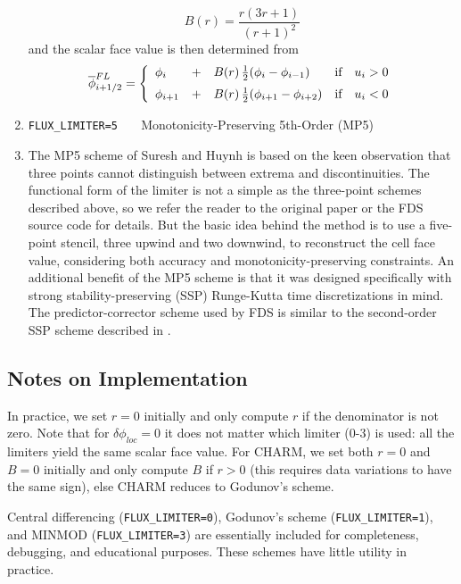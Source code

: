 \begin{enumerate}
\begin{equation}
B(r) = \frac{r(3r+1)}{(r+1)^2}
\end{equation}
and the scalar face value is then determined from
\begin{equation}
\label{eqn_charm_limiter}
\overline{\phi}^{FL}_{i+1/2} = \left\{ \begin{array}{lcll} \phi_i &+& B(r) \,\frac{1}{2}(\phi_i-\phi_{i-1}) & \mbox{if} \quad u_i>0 \vspace{0.2 cm}\\
\phi_{i+1} &+& B(r) \,\frac{1}{2}(\phi_{i+1}-\phi_{i+2}) & \mbox{if} \quad u_i<0 \end{array} \right.
\end{equation}
\item[]{\tt FLUX\_LIMITER=5\,\,\,} Monotonicity-Preserving 5th-Order (MP5)
\item[] The MP5 scheme of Suresh and Huynh \cite{Suresh:1997} is based on the keen observation that three points cannot distinguish between extrema and discontinuities.  The functional form of the limiter is not a simple as the three-point schemes described above, so we refer the reader to the original paper or the FDS source code for details.  But the basic idea behind the method is to use a five-point stencil, three upwind and two downwind, to reconstruct the cell face value, considering both accuracy and monotonicity-preserving constraints.  An additional benefit of the MP5 scheme is that it was designed specifically with strong stability-preserving (SSP) Runge-Kutta time discretizations in mind.  The predictor-corrector scheme used by FDS is similar to the second-order SSP scheme described in \cite{Gottlieb:2001}.
\end{enumerate}

\subsection*{Notes on Implementation}

In practice, we set $r=0$ initially and only compute $r$ if the denominator is not zero.  Note that for $\delta \phi_{loc}=0$ it does not matter which limiter (0-3) is used: all the limiters yield the same scalar face value.  For CHARM, we set both $r=0$ and $B=0$ initially and only compute $B$ if $r>0$ (this requires data variations to have the same sign), else CHARM reduces to Godunov's scheme.

Central differencing ({\tt FLUX\_LIMITER=0}), Godunov's scheme ({\tt FLUX\_LIMITER=1}), and MINMOD ({\tt FLUX\_LIMITER=3}) are essentially included for completeness, debugging, and educational purposes.  These schemes have little utility in practice.

